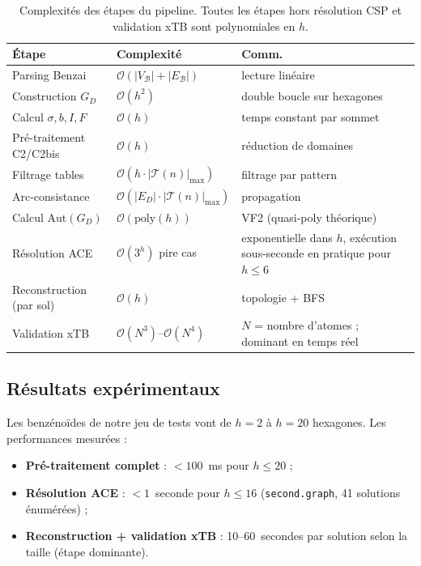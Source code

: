 \documentclass[12pt,a4paper]{article}
\theoremstyle{definition}
\theoremstyle{remark}
\newcommand{\B}{\mathcal{B}}
\newcommand{\GD}{G_{\!D}}
\newcommand{\ED}{E_{\!D}}
\newcommand{\Tn}{\mathcal{T}(n)}
\newcommand{\Aut}{\mathrm{Aut}}
\newcommand{\bigO}{\mathcal{O}}
\begin{document}
\begin{table}[!ht]
\centering
\renewcommand{\arraystretch}{1.3}
\begin{tabular}{@{}llp{6.5cm}@{}}
\toprule
\textbf{\'Etape} & \textbf{Complexit\'e} & \textbf{Comm.} \\
\midrule
Parsing Benzai & $\bigO(|V_\B| + |E_\B|)$ & lecture lin\'eaire \\
Construction $\GD$ & $\bigO(h^2)$ & double boucle sur hexagones \\
Calcul $\sigma, b, I, F$ & $\bigO(h)$ & temps constant par sommet \\
Pr\'e-traitement C2/C2bis & $\bigO(h)$ & r\'eduction de domaines \\
Filtrage tables & $\bigO(h \cdot |\Tn|_{\max})$ & filtrage par pattern \\
Arc-consistance & $\bigO(|\ED| \cdot |\Tn|_{\max})$ & propagation \\
Calcul $\Aut(\GD)$ & $\bigO(\text{poly}(h))$ & VF2 (quasi-poly th\'eorique) \\
R\'esolution ACE & $\bigO(3^h)$ pire cas & exponentielle dans $h$, ex\'ecution sous-seconde en pratique pour $h \leq 6$ \\
Reconstruction (par sol) & $\bigO(h)$ & topologie + BFS \\
Validation xTB & $\bigO(N^3)$--$\bigO(N^4)$ & $N$ = nombre d'atomes ; dominant en temps r\'eel \\
\bottomrule
\end{tabular}
\caption{Complexit\'es des \'etapes du pipeline. Toutes les \'etapes
hors r\'esolution CSP et validation xTB sont polynomiales en $h$.}
\label{tab:complexites}
\end{table}

\subsection{R\'esultats exp\'erimentaux}

Les benz\'eno\"ides de notre jeu de tests vont de $h = 2$ \`a $h = 20$
hexagones. Les performances mesur\'ees :
\begin{itemize}
  \item \textbf{Pr\'e-traitement complet} : $< 100$~ms pour $h \leq 20$ ;
  \item \textbf{R\'esolution ACE} : $< 1$~seconde pour $h \leq 16$
        (\texttt{second.graph}, 41 solutions \'enum\'er\'ees) ;
  \item \textbf{Reconstruction + validation xTB} : 10--60~secondes
        par solution selon la taille (\'etape dominante).
\end{itemize}
\end{document}
